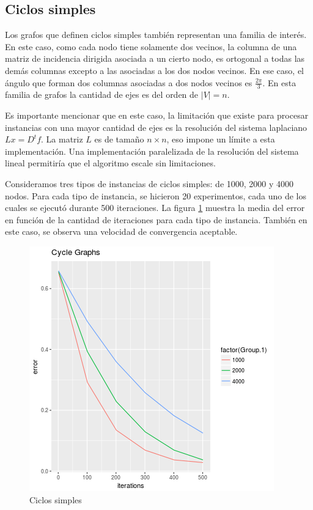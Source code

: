 \documentclass[conference,compsoc,a4paper]{IEEEtran}
\begin{document}
\subsection{Ciclos simples}

Los grafos que definen ciclos simples también representan una familia 
de interés. En este caso, como cada nodo tiene solamente dos vecinos, 
la columna de una matriz de incidencia dirigida asociada a un cierto 
nodo, es ortogonal a todas las demás columnas excepto a las asociadas a 
los dos nodos vecinos. En ese caso, el ángulo que forman dos columnas
asociadas a dos nodos vecinos es $\frac{2\pi}{3}$. En esta familia de 
grafos la cantidad de ejes es del orden de $|V| = n$.

\smallskip

Es importante mencionar que en este caso, la limitación que existe para 
procesar instancias con una mayor cantidad de ejes es la resolución del 
sistema laplaciano $Lx = D^t f$. La matriz $L$ es de tamaño $n \times 
n$, eso impone un límite a esta implementación. Una implementación 
paralelizada de la resolución del sistema lineal permitiría que el 
algoritmo escale sin limitaciones.

\smallskip

Consideramos tres tipos de instancias de ciclos simples: de 1000, 2000 
y 4000 nodos. Para cada tipo de instancia, se hicieron 20 experimentos, 
cada uno de los cuales se ejecutó durante 500 iteraciones. La figura 
\ref{fig:cycle} muestra la media del error en función de la cantidad 
de iteraciones para cada tipo de instancia. También en este caso, se 
observa una velocidad de convergencia aceptable.

\begin{figure}
	\includegraphics[width=\linewidth]{cycle_graphs.png} %
	\caption{Ciclos simples} %
	\label{fig:cycle} %
\end{figure}
\end{document}
